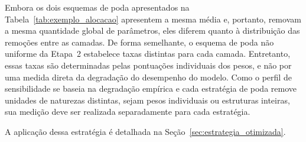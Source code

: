 
Embora os dois esquemas de poda apresentados na Tabela~\ref{tab:exemplo_alocacao}
apresentem a mesma média e, portanto, removam a mesma quantidade global de parâmetros, eles
diferem quanto à distribuição das remoções entre as camadas. De forma semelhante, o esquema
de poda não uniforme da Etapa~2 estabelece taxas distintas para cada camada. Entretanto,
essas taxas são determinadas pelas pontuações individuais dos pesos, e não por uma medida
direta da degradação do desempenho do modelo. Como o perfil de sensibilidade se baseia na
degradação empírica e cada estratégia de poda remove unidades de naturezas distintas, sejam
pesos individuais ou estruturas inteiras, sua medição deve ser realizada separadamente para
cada estratégia.

A aplicação dessa estratégia é detalhada na Seção~\ref{sec:estrategia_otimizada}.

